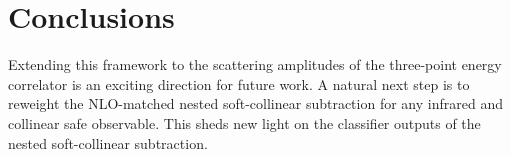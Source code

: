\section{Conclusions}\label{sec:conclusions}

Extending this framework to the scattering amplitudes of the three-point
energy correlator is an exciting direction for future work. A natural
next step is to reweight the NLO-matched nested soft-collinear
subtraction for any infrared and collinear safe observable. This sheds
new light on the classifier outputs of the nested soft-collinear
subtraction.

